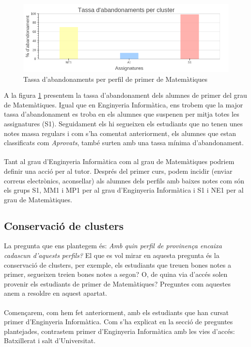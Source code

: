 \documentclass[12pt,a4paper,catalan]{article}
\begin{document}
\begin{figure}[h]
\centering
\includegraphics[width=.9\linewidth]{img/abandonaments_primer_mates.png}
\caption{Tassa d'abandonaments per perfil de primer de Matemàtiques}
\label{fig:tappm}
\end{figure}

A la figura \ref{fig:tappm} presentem la tassa d'abandonament dels alumnes de primer del grau de Matemàtiques. Igual que en Enginyeria Informàtica, ens trobem que la major tassa d'abandonament es troba en els alumnes que suspenen per mitja totes les assignatures (S1). Seguidament els hi segueixen els estudiants que no tenen unes notes massa regulars i com s'ha comentat anteriorment, els alumnes que estan classificats com \textit{Aprovats}, també surten amb una tassa mínima d'abandonament.
\\
\\
Tant al grau d'Enginyeria Informàtica com al grau de Matemàtiques podriem definir una acció per al tutor. Després del primer curs, podem incidir (enviar correus electrònics, aconsellar) als alumnes dels perfils amb baixes notes com són els grups S1, MM1 i MP1 per al grau d'Enginyeria Informàtica i S1 i NE1 per al grau de Matemàtiques.

\subsection{Conservació de clusters}
La pregunta que ens plantegem és: \textit{Amb quin perfil de provinença encaixa cadascun d'aquests perfils?} El que es vol mirar en aquesta pregunta és la conservació de clusters, per exemple, els estudiants que treuen bones notes a primer, segueixen treien bones notes a segon? O, de quina via d'accés solen provenir els estudiants de primer de Matemàtiques? Preguntes com aquestes anem a resoldre en aquest apartat. 
\\
\\
Començarem, com hem fet anteriorment, amb els estudiants que han cursat primer d'Enginyeria Informàtica. Com s'ha explicat en la secció de preguntes plantejades, contrastem primer d'Enginyeria Informàtica amb les vies d'accés: Batxillerat i salt d'Universitat.
\end{document}
